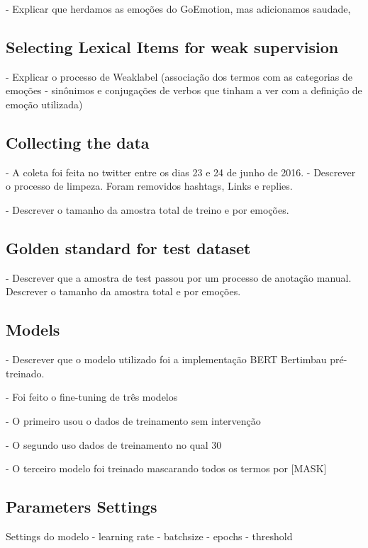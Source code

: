 \documentclass[12pt]{article}
\begin{document}
- Explicar que herdamos as emoções do GoEmotion, mas adicionamos saudade,


\subsection{Selecting Lexical Items for weak supervision }
- Explicar o processo de Weaklabel (associação dos termos com as categorias de emoções - sinônimos e conjugações de verbos que tinham a ver com a definição de emoção utilizada)

\subsection{Collecting the data}

- A coleta foi feita no twitter entre os dias 23 e 24 de junho de 2016. 
- Descrever o processo de limpeza. Foram removidos hashtags, Links e replies.

- Descrever o tamanho da amostra total de treino e por emoções. 

\subsection{Golden standard for test dataset}

- Descrever que a amostra de test passou por um processo de anotação manual. Descrever o tamanho da amostra total e por emoções.



\subsection{Models}
- Descrever que o modelo utilizado foi a implementação BERT Bertimbau pré-treinado. 

- Foi feito o fine-tuning de três modelos

- O primeiro usou o dados de treinamento sem intervenção

- O segundo uso dados de treinamento no qual 30%

- O terceiro modelo foi treinado mascarando todos os termos por [MASK]

\subsection{Parameters Settings}
Settings do modelo
- learning rate
- batchsize 
- epochs
- threshold 
\end{document}
